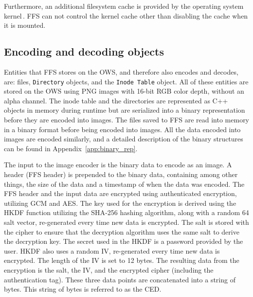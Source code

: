 Furthermore, an additional filesystem cache is provided by the operating system kernel\,\cite{fleischerMountOptionsOsxfuse2020, gowdappaExperiencesFUSEReal2019}. \gls{FFS} can not control the kernel cache other than disabling the cache when it is mounted. 

\subsection{Encoding and decoding objects}
\label{subsec:file_enc_dec}
Entities that \gls{FFS} stores on the \gls{OWS}, and therefore also encodes and decodes, are: files, \texttt{Directory} objects, and the \texttt{Inode Table} object. All of these entities are stored on the \gls{OWS} using PNG images with \mbox{16-bit} \gls{RGB} color depth, without an alpha channel. The inode table and the directories are represented as C++ objects in memory during runtime but are serialized into a binary representation before they are encoded into images. The files saved to \gls{FFS} are read into memory in a binary format before being encoded into images. All the data encoded into images are encoded similarly, and a detailed description of the binary structures can be found in Appendix~\ref{app:binary_rep}. 

The input to the image encoder is the binary data to encode as an image. A header (\gls{FFS} header) is prepended to the binary data, containing among other things, the size of the data and a timestamp of when the data was encoded. The \gls{FFS} header and the input data are encrypted using authenticated encryption, utilizing \gls{GCM} and \gls{AES}. The key used for the encryption is derived using the \gls{HKDF} function utilizing the \gls{SHA}-256 hashing algorithm, along with a random \SI{64}{\byte} salt vector, \mbox{re-generated} every time new data is encrypted. The salt is stored with the cipher to ensure that the decryption algorithm uses the same salt to derive the decryption key. The secret used in the \gls{HKDF} is a password provided by the user. \gls{HKDF} also uses a random \gls{IV}, \mbox{re-generated} every time new data is encrypted. The length of the \gls{IV} is set to 12 bytes. The resulting data from the encryption is the salt, the \gls{IV}, and the encrypted cipher (including the authentication tag). These three data points are concatenated into a string of bytes. This string of bytes is referred to as the \gls{CED}.

